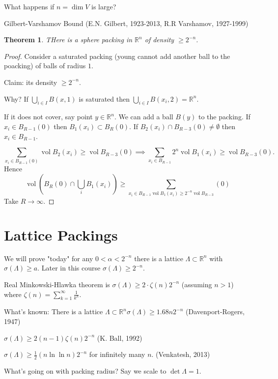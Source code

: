 \documentclass{report}
\newcommand{\R}{\mathbb{R}}
\newcommand{\vol}{\operatorname{vol}}
\newtheorem{theorem}{Theorem}[section]
\theoremstyle{definition}
\theoremstyle{remark}
\numberwithin{equation}{section}
\begin{document}
What happens if $n = \dim V$ is large?

Gilbert-Varshamov Bound (E.N. Gilbert, 1923-2013, R.R Varshamov, 1927-1999)
\begin{theorem}
    THere is a sphere packing in $\R^n$ of density $\geq 2^{-n}$.
\end{theorem}
\begin{proof}
    Consider a saturated packing (young cannot add another ball to the poacking) of balls of radius $1$.

    Claim: its density $\geq 2^{-n}$.

    Why? If $\bigcup_{i \in I} B(x, 1)$ is saturated then $\bigcup_{i \in I} B(x_i, 2) = \R^n$.

    If it does not cover, say point $y \in \R^n$. We can add a ball $B(y)$ to the packing. If $x_i \in  B_{R-1}(0)$ then $B_1(x_i) \subset B_R(0)$. If $B_2(x_i) \cap B_{R-3}(0) \neq \emptyset$ then $x_i \in B_{R-1}$.

    \[\sum_{x_i \in B_{R-1}(0)}\vol B_2(x_i) \geq \vol B_{R-3}(0) \implies \sum_{x_i \in B_{R-1}}2^n\vol B_1(x_i) \geq \vol B_{R-3}(0).\]
    Hence \[\vol \left(B_R(0) \cap \bigcup_{i} B_1(x_i)\right) \geq \sum_{x_i \in B_{R-1} \vol B_1(x_i) \geq 2^{-n}\vol B_{R-3}}(0)\]
    Take $R \to \infty$.
\end{proof}

\section{Lattice Packings}
We will prove "today" for any $0 < \alpha < 2^{-n}$ there is a lattice $\Lambda \subset  \R^n$ with $\sigma(\Lambda) \geq a$. Later in this course $\sigma (\Lambda) \geq 2^{-n}$.

Real Minkowski-Hlawka theorem is $\sigma(\Lambda) \geq 2 \cdot \zeta(n)2^{-n}$ (assuming $n > 1$) where $\zeta(n) = \sum_{k=1}^\infty \frac{1}{k^n}$.

What's known:
There is a lattice $\Lambda \subset \R^n \sigma(\Lambda) \geq 1.68n2^{-n}$ (Davenport-Rogers, 1947)

$\sigma(\Lambda) \geq 2(n-1)\zeta(n)2^{-n}$ (K. Ball, 1992)

$\sigma(\Lambda) \geq \frac{1}{2}(n \ln \ln n) 2^{-n}$ for infinitely many $n$. (Venkatesh, 2013)

What's going on with packing radius? Say we scale to $\det \Lambda = 1$.
\end{document}
